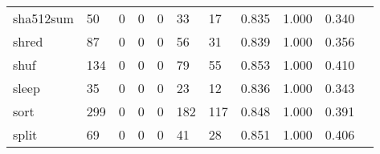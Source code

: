 \begin{longtable}{lp{1.2cm}p{1.2cm}p{1.2cm}p{1.2cm}p{1.2cm}p{1.2cm}p{1.2cm}p{1.2cm}p{1.2cm}p{1.2cm}}
sha512sum &                                    50 &                                                  0 &                                                  0 &                                                  0 &                                                 33 &                                                 17 &                                         0.835 &                                              1.000 &                                              0.340 \\
shred     &                                    87 &                                                  0 &                                                  0 &                                                  0 &                                                 56 &                                                 31 &                                         0.839 &                                              1.000 &                                              0.356 \\
shuf      &                                   134 &                                                  0 &                                                  0 &                                                  0 &                                                 79 &                                                 55 &                                         0.853 &                                              1.000 &                                              0.410 \\
sleep     &                                    35 &                                                  0 &                                                  0 &                                                  0 &                                                 23 &                                                 12 &                                         0.836 &                                              1.000 &                                              0.343 \\
sort      &                                   299 &                                                  0 &                                                  0 &                                                  0 &                                                182 &                                                117 &                                         0.848 &                                              1.000 &                                              0.391 \\
split     &                                    69 &                                                  0 &                                                  0 &                                                  0 &                                                 41 &                                                 28 &                                         0.851 &                                              1.000 &                                              0.406 \\

\end{longtable}
